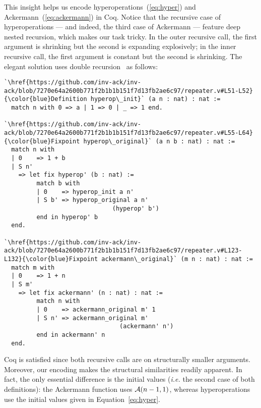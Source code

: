 This insight helps us encode hyperoperations~(\ref{eq:hyper}) and
Ackermann~(\ref{eq:ackermann}) in Coq.  Notice that the recursive case of hyperoperations --- and
indeed, the third case of Ackermann --- feature deep nested recursion, 
which makes our task tricky. 
In the outer recursive call, the first argument is shrinking
but the second is expanding explosively; in the inner recursive call, the first argument is
constant but the second is shrinking. The elegant solution uses double recursion~\cite{bertotcast} as follows:
\begin{lstlisting}
`\href{https://github.com/inv-ack/inv-ack/blob/7270e64a2600b771f2b1b1b151f7d13fb2ae6c97/repeater.v#L51-L52}{\color{blue}Definition hyperop\_init}` (a n : nat) : nat :=
  match n with 0 => a | 1 => 0 | _ => 1 end.

`\href{https://github.com/inv-ack/inv-ack/blob/7270e64a2600b771f2b1b1b151f7d13fb2ae6c97/repeater.v#L55-L64}{\color{blue}Fixpoint hyperop\_original}` (a n b : nat) : nat :=
  match n with
  | 0    => 1 + b
  | S n'
    => let fix hyperop' (b : nat) :=
         match b with
         | 0    => hyperop_init a n'
         | S b' => hyperop_original a n' 
                              (hyperop' b')
         end in hyperop' b
  end.

`\href{https://github.com/inv-ack/inv-ack/blob/7270e64a2600b771f2b1b1b151f7d13fb2ae6c97/repeater.v#L123-L132}{\color{blue}Fixpoint ackermann\_original}` (m n : nat) : nat :=
  match m with
  | 0    => 1 + n
  | S m'
    => let fix ackermann' (n : nat) : nat :=
         match n with
         | 0    => ackermann_original m' 1
         | S n' => ackermann_original m' 
                                (ackermann' n')
         end in ackermann' n
  end.
\end{lstlisting}
Coq is satisfied since both recursive calls are on structurally smaller arguments.
Moreover, our encoding makes the structural similarities
 readily apparent.  In fact, the only essential difference is the initial values
(\emph{i.e.} the second case of both definitions): the Ackermann function uses $\mathcal{A}(n-1,1)$, whereas
hyperoperations use the initial values given in Equation~\ref{eq:hyper}.

